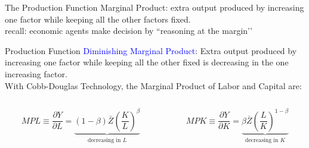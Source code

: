 \documentclass[notes,11pt, aspectratio=169, xcolor=table]{beamer}
\begin{document}
\begin{frame}{The Production Function}
  \huge{Marginal Product: extra output produced by increasing one factor while keeping all the other factors fixed.} \\
  \vspace{20pt}
  \Large{recall: economic agents make decision by ``reasoning at the margin’’}
\end{frame}

\begin{frame}{Production Function}
  \Large{\textcolor{blue}{Diminishing Marginal Product}: Extra output produced by increasing one factor
while keeping all the other fixed is decreasing in the one increasing factor.} \\
  \vspace{20pt}
  \normalsize With Cobb-Douglas Technology, the Marginal Product of Labor and Capital are:
  \vspace{20pt}
  \begin{columns}[T] %
\begin{column}{.5\textwidth}
\begin{equation*}
  MPL \equiv \frac{\partial Y}{\partial L} = \underbrace{(1-\beta) \bar{Z} \left( \frac{K}{L} \right)^{\beta}}_{\text{decreasing in } L}
\end{equation*}
\end{column}%
\hfill%
\begin{column}{.5\textwidth}
\begin{equation*}
  MPK \equiv \frac{\partial Y}{\partial K} = \underbrace{\beta \bar{Z} \left( \frac{L}{K} \right)^{1-\beta}}_{\text{decreasing in } K}
\end{equation*}

\end{column}%
\end{columns}
\end{frame}
\end{document}
